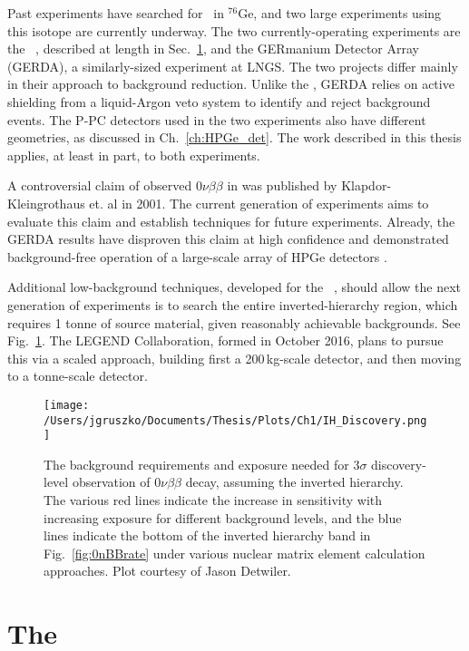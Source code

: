 Past experiments have searched for \nonubb\ in $^{76}$Ge, and two large experiments using this isotope are currently underway. The two currently-operating experiments are the \MJ\ \DEM, described at length in Sec.~\ref{sec:MJD}, and the GERmanium Detector Array (GERDA), a similarly-sized experiment at LNGS. The two projects differ mainly in their approach to background reduction. Unlike the \DEM, GERDA relies on active shielding from a liquid-Argon veto system to identify and reject background events. The P-PC detectors used in the two experiments also have different geometries, as discussed in Ch.~\ref{ch:HPGe_det}\cite{GERDA_Device2013}. The work described in this thesis applies, at least in part, to both experiments. 

A controversial claim of observed $0\nu\beta\beta$ in  was published by Klapdor-Kleingrothaus et. al in 2001\cite{KK2001}. The current generation of experiments aims to evaluate this claim and establish techniques for future experiments. Already, the GERDA results have disproven this claim at high confidence and demonstrated background-free operation of a large-scale array of HPGe detectors \cite{GERDA2017}. 

Additional low-background techniques, developed for the \MJ\ \DEM, should allow the next generation of experiments is to search the entire inverted-hierarchy region, which requires 1 tonne of source material, given reasonably achievable backgrounds. See Fig.~\ref{IH_Discovery}. The LEGEND Collaboration, formed in October 2016, plans to pursue this via a scaled approach, building first a 200\,kg-scale detector, and then moving to a tonne-scale detector.    

\begin{figure}[]
\texttt{[image: /Users/jgruszko/Documents/Thesis/Plots/Ch1/IH\_Discovery.png]}
\caption{The background requirements and exposure needed for $3\sigma$ discovery-level observation of $0\nu\beta\beta$ decay, assuming the inverted hierarchy. The various red lines indicate the increase in sensitivity with increasing exposure for different background levels, and the blue lines indicate the bottom of the inverted hierarchy band in Fig.~\ref{fig:0nBBrate} under various nuclear matrix element calculation approaches. Plot courtesy of Jason Detwiler.}
\label{IH_Discovery}
\end{figure}

\section{The \MJ\ \DEM}\label{sec:MJD}
